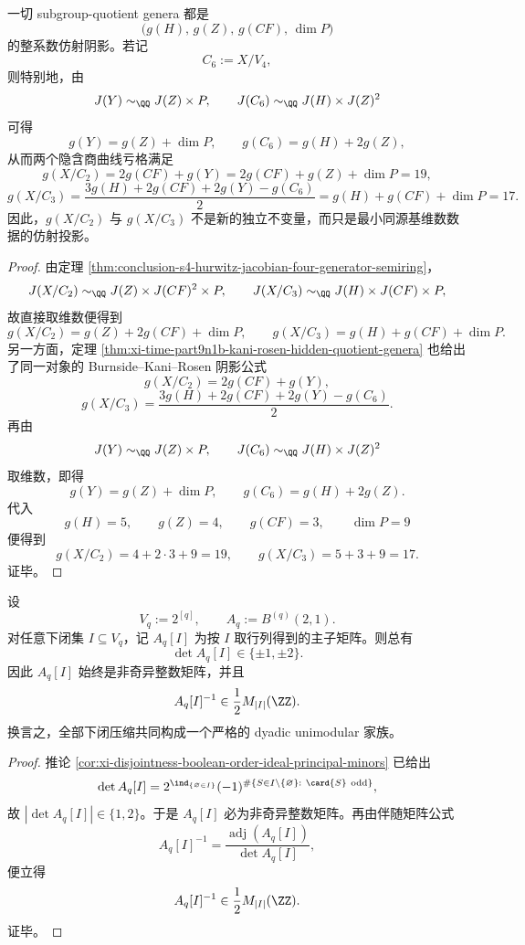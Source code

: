 \begin{corollary}[隐含商曲线亏格的仿射阴影]\label{cor:conclusion-s4-hidden-quotient-genera-affine-shadows}
一切 subgroup-quotient genera 都是
\[
\bigl(g(H),\,g(Z),\,g(CF),\,\dim P\bigr)
\]
的整系数仿射阴影。若记
\[
C_6:=X/V_4,
\]
则特别地，由
\[
J(Y)\sim_{\QQ}J(Z)\times P,\qquad
J(C_6)\sim_{\QQ}J(H)\times J(Z)^2
\]
可得
\[
g(Y)=g(Z)+\dim P,\qquad
g(C_6)=g(H)+2g(Z),
\]
从而两个隐含商曲线亏格满足
\[
g(X/C_2)=2g(CF)+g(Y)=2g(CF)+g(Z)+\dim P=19,
\]
\[
g(X/C_3)=\frac{3g(H)+2g(CF)+2g(Y)-g(C_6)}{2}
=g(H)+g(CF)+\dim P=17.
\]
因此，\(g(X/C_2)\) 与 \(g(X/C_3)\) 不是新的独立不变量，而只是最小同源基维数数据的仿射投影。
\end{corollary}
\begin{proof}
由定理 \ref{thm:conclusion-s4-hurwitz-jacobian-four-generator-semiring}，
\[
J(X/C_2)\sim_{\QQ}J(Z)\times J(CF)^2\times P,
\qquad
J(X/C_3)\sim_{\QQ}J(H)\times J(CF)\times P,
\]
故直接取维数便得到
\[
g(X/C_2)=g(Z)+2g(CF)+\dim P,
\qquad
g(X/C_3)=g(H)+g(CF)+\dim P.
\]
另一方面，定理 \ref{thm:xi-time-part9n1b-kani-rosen-hidden-quotient-genera} 也给出了同一对象的 Burnside--Kani--Rosen 阴影公式
\[
g(X/C_2)=2g(CF)+g(Y),
\]
\[
g(X/C_3)=\frac{3g(H)+2g(CF)+2g(Y)-g(C_6)}{2}.
\]
再由
\[
J(Y)\sim_{\QQ}J(Z)\times P,\qquad
J(C_6)\sim_{\QQ}J(H)\times J(Z)^2
\]
取维数，即得
\[
g(Y)=g(Z)+\dim P,\qquad
g(C_6)=g(H)+2g(Z).
\]
代入
\[
g(H)=5,\qquad g(Z)=4,\qquad g(CF)=3,\qquad \dim P=9
\]
便得到
\[
g(X/C_2)=4+2\cdot 3+9=19,\qquad
g(X/C_3)=5+3+9=17.
\]
证毕。
\end{proof}

\begin{theorem}\label{thm:conclusion-boolean-orderideal-dyadic-unimodularity}
设
\[
V_q:=2^{[q]},
\qquad
A_q:=B^{(q)}(2,1).
\]
对任意下闭集 \(I\subseteq V_q\)，记 \(A_q[I]\) 为按 \(I\) 取行列得到的主子矩阵。则总有
\[
\det A_q[I]\in\{\pm 1,\pm 2\}.
\]
因此 \(A_q[I]\) 始终是非奇异整数矩阵，并且
\[
A_q[I]^{-1}\in \frac12 M_{|I|}(\ZZ).
\]
换言之，全部下闭压缩共同构成一个严格的 dyadic unimodular 家族。
\end{theorem}
\begin{proof}
推论 \ref{cor:xi-disjointness-boolean-order-ideal-principal-minors} 已给出
\[
\det A_q[I]
=2^{\ind_{\{\varnothing\in I\}}}
(-1)^{\#\{S\in I\setminus\{\varnothing\}:\ \card{S}\ \mathrm{odd}\}},
\]
故 \(|\det A_q[I]|\in\{1,2\}\)。于是 \(A_q[I]\) 必为非奇异整数矩阵。再由伴随矩阵公式
\[
A_q[I]^{-1}=\frac{\operatorname{adj}(A_q[I])}{\det A_q[I]},
\]
便立得
\[
A_q[I]^{-1}\in \frac12 M_{|I|}(\ZZ).
\]
证毕。
\end{proof}

